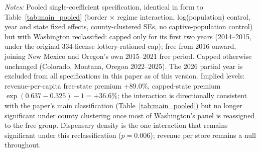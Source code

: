 \begin{table}[htbp]
\centering
\caption{Featured specification: border $\times$ regime interaction, Washington split at its 2016 cap increase}
\label{tab:wa2016split_pooled}
\footnotesize
{}
\begin{minipage}{0.98\textwidth}
\vspace{0.3em}
\footnotesize
\textit{Notes:} Pooled single-coefficient specification, identical in form to Table~\ref{tab:main_pooled}
(border $\times$ regime interaction, log(population) control, year and state fixed effects,
county-clustered SEs, no captive-population control) but with Washington reclassified: capped only for its
first two years (2014--2015, under the original 334-license lottery-rationed cap); free from 2016 onward,
joining New Mexico and Oregon's own 2015--2021 free period. Capped otherwise unchanged (Colorado, Montana,
Oregon 2022--2025). The 2026 partial year is excluded from all specifications in this paper as of this
version. Implied levels: revenue-per-capita free-state premium $+89.0\%$, capped-state premium
$\exp(0.637-0.325)-1=+36.6\%$; the interaction is directionally consistent with the paper's main
classification (Table~\ref{tab:main_pooled}) but no longer significant under county clustering once most of
Washington's panel is reassigned to the free group. Dispensary density is the one interaction that remains
significant under this reclassification ($p=0.006$); revenue per store remains a null throughout.
\end{minipage}
\end{table}
